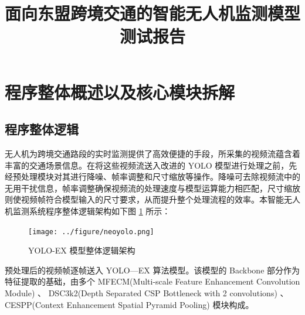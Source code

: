 \documentclass[runningheads]{llncs}
\begin{document}
\title{面向东盟跨境交通的智能无人机监测模型测试报告}

\author{
{}
}

\institute{
 {}
}

\maketitle



\section{程序整体概述以及核心模块拆解}

\subsection{程序整体逻辑}

无人机为跨境交通路段的实时监测提供了高效便捷的手段，所采集的视频流蕴含着丰富的交通场景信息。在将这些视频流送入改进的 YOLO 模型进行处理之前，先经预处理模块对其进行降噪、帧率调整和尺寸缩放等操作。降噪可去除视频流中的无用干扰信息，帧率调整确保视频流的处理速度与模型运算能力相匹配，尺寸缩放则使视频帧符合模型输入的尺寸要求，从而提升整个处理流程的效率。本智能无人机监测系统程序整体逻辑架构如下图 \ref{fig:neoyolo} 所示：

\begin{figure}[htbp]
    \centering
    \texttt{[image: ../figure/neoyolo.png]}
    \caption{YOLO-EX 模型整体逻辑架构}
    \label{fig:neoyolo}
\end{figure}

预处理后的视频帧逐帧送入 YOLO—EX 算法模型。该模型的 Backbone 部分作为特征提取的基础，由多个 MFECM(Multi-scale Feature Enhancement Convolution Module) 、 DSC3k2(Depth Separated CSP Bottleneck with 2 convolutions) 、CESPP(Context Enhancement Spatial Pyramid Pooling) 模块构成。
\end{document}
